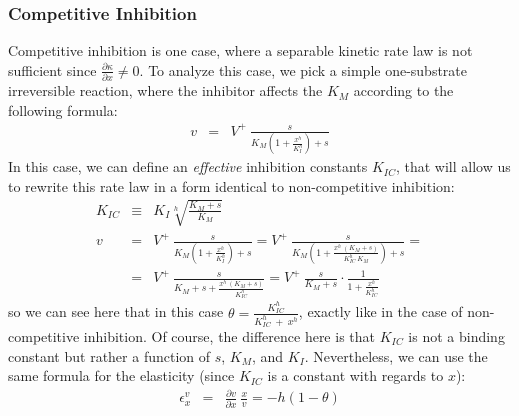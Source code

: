 \documentclass[12pt,a4paper]{article}
\begin{document}
\subsubsection{Competitive Inhibition}
Competitive inhibition is one case, where a separable kinetic rate law is not sufficient since $\frac{\partial \kappa}{\partial x} \neq 0$. To analyze this case, we pick a simple one-substrate irreversible reaction, where the inhibitor affects the $K_M$ according to the following formula:
\begin{eqnarray}
    v &=& V^+ ~ \frac{s}{K_M \left(1 + \frac{x^h}{K_I^h}\right) + s}
\end{eqnarray}
In this case, we can define an \emph{effective} inhibition constants $K_{IC}$, that will allow us to rewrite this rate law in a form identical to non-competitive inhibition:
\begin{eqnarray}
    K_{IC} &\equiv& K_I \sqrt[h]{\frac{K_M + s}{K_M}} \nonumber\\
    v &=& V^+ ~ \frac{s}{K_M \left(1 + \frac{x^h}{K_I^h}\right) + s} =
          V^+ ~ \frac{s}{K_M \left(1 + \frac{x^h~(K_M + s)}{K_{IC}^h~K_M}\right) + s} = \nonumber\\
      &=& V^+ ~ \frac{s}{K_M + s + \frac{x^h~(K_M + s)}{K_{IC}^h}} = 
          V^+ ~ \frac{s}{K_M + s} \cdot \frac{1}{1 + \frac{x^h}{K_{IC}^h}} \label{eq:eps_comp_inh}
\end{eqnarray}
so we can see here that in this case $\theta = \frac{K_{IC}^h}{K_{IC}^h~+~x^h}$, exactly like in the case of non-competitive inhibition. Of course, the difference here is that $K_{IC}$ is not a binding constant but rather a function of $s$, $K_M$, and $K_I$. Nevertheless, we can use the same formula for the elasticity (since $K_{IC}$ is a constant with regards to $x$):
\begin{eqnarray}
    \epsilon_x^v &=& \frac{\partial v}{\partial x}~\frac{x}{v} = -h(1 - \theta)
\end{eqnarray}
\end{document}
